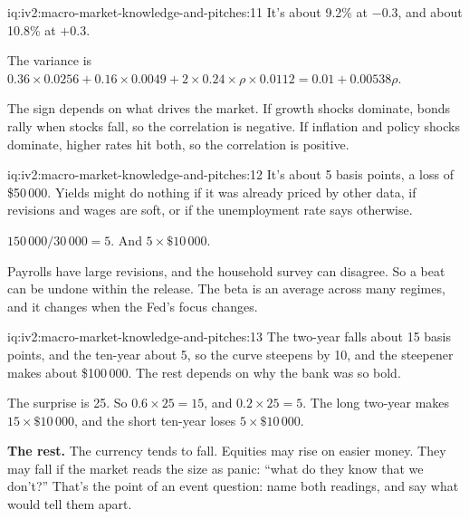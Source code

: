 \begin{solution}{iq:iv2:macro-market-knowledge-and-pitches:11}
It's about 9.2\% at $-0.3$, and about 10.8\% at $+0.3$.

The variance is $0.36 \times 0.0256 + 0.16 \times 0.0049 + 2 \times 0.24 \times \rho \times 0.0112 = 0.01 + 0.00538\rho$.

The sign depends on what drives the market. If growth shocks dominate, bonds rally when stocks fall, so the correlation is negative. If inflation and policy shocks dominate, higher rates hit both, so the correlation is positive.

\end{solution}

\begin{solution}{iq:iv2:macro-market-knowledge-and-pitches:12}
It's about 5 basis points, a loss of \$50\,000. Yields might do nothing if it was already priced by other data, if revisions and wages are soft, or if the unemployment rate says otherwise.

$150\,000/30\,000 = 5$. And $5 \times \$10\,000$.

Payrolls have large revisions, and the household survey can disagree. So a beat can be undone within the release. The beta is an average across many regimes, and it changes when the Fed's focus changes.

\end{solution}

\begin{solution}{iq:iv2:macro-market-knowledge-and-pitches:13}
The two-year falls about 15 basis points, and the ten-year about 5, so the curve steepens by 10, and the steepener makes about \$100\,000. The rest depends on why the bank was so bold.

The surprise is 25. So $0.6 \times 25 = 15$, and $0.2 \times 25 = 5$. The long two-year makes $15 \times \$10\,000$, and the short ten-year loses $5 \times \$10\,000$.

\textbf{The rest.} The currency tends to fall. Equities may rise on easier money. They may fall if the market reads the size as panic: ``what do they know that we don't?'' That's the point of an event question: name both readings, and say what would tell them apart.

\end{solution}

